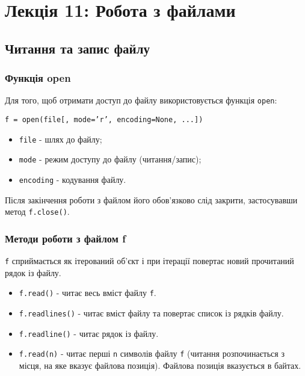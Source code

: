 \section*{Лекція 11: Робота з файлами}
 
 \subsection{Читання та запис файлу} 
\begin{frame}
\frametitle{Функція open}
Для того, щоб отримати доступ до файлу використовується функція \texttt{open}:

\texttt{f = open(file[, mode='r', encoding=None, ...])}

\begin{itemize}
  \item \texttt{file} - шлях до файлу;
  \item \texttt{mode} - режим доступу до файлу (читання/запис);
  \item \texttt{encoding} - кодування файлу.
\end{itemize}

Після закінчення роботи з файлом його обов'язково слід закрити, застосувавши метод \texttt{f.close()}.

\end{frame}

\begin{frame}
\frametitle{Методи роботи з файлом f}

\texttt{f} сприймається як ітерований об'єкт і при ітерації повертає новий прочитаний рядок із файлу.

\begin{itemize}
  \item<1->  \texttt{f.read()} - читає весь вміст файлу \texttt{f}. 
  \item<1-> \texttt{f.readlines()} - читає вміст файлу та повертає список із рядків файлу. 
  \item<2-> \texttt{f.readline()} - читає рядок із файлу.
  \item<2-> \texttt{f.read(n)} - читає перші \texttt{n} символів файлу \texttt{f} (читання розпочинається з місця, на яке вказує файлова позиція). Файлова позиція вказується в байтах.
  
\end{itemize}
\end{frame}

